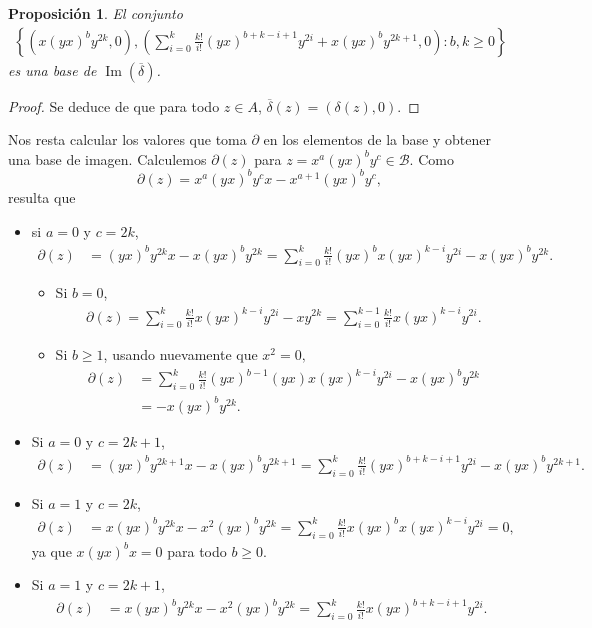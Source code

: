 \documentclass[a4paper,oneside,fleqn,11pt]{article}
\newtheorem{prop}{Proposición}
\numberwithin{prop}{subsection}
\DeclareMathOperator\Ima{Im}
\begin{document}
\begin{prop}
El conjunto
\begin{align*}
		\left\{ \left(x(yx)^by^{2k}, 0\right),
			\left(\sum_{i = 0}^k\frac{k!}{i!}(yx)^{b + k - i + 1}y^{2i} + x(yx)^by^{2k + 1},0\right) :b, k \geq 0 \right\}
\end{align*}
es una base de $\Ima(\overline{\delta})$.
\end{prop}
\begin{proof}
	Se deduce de que para todo $z \in A$, $\overline{\delta}(z) = (\delta(z), 0)$.
\end{proof}

Nos resta calcular los valores que toma $\partial$ en los elementos de la base y obtener una base de imagen.
Calculemos $\partial(z)$ para $z = x^a(yx)^by^c \in \mathcal{B}$. Como \[\partial(z) = x^a(yx)^by^cx - x^{a + 1}(yx)^by^c,\] resulta que
\begin{itemize}
\item si $a = 0$ y $c = 2k$,
	\begin{align*}
		\partial(z) &= (yx)^by^{2k}x - x(yx)^by^{2k} = \sum_{i = 0}^k\frac{k!}{i!}(yx)^bx(yx)^{k - i}y^{2i} - x(yx)^by^{2k}.
	\end{align*}
	\begin{itemize}
	\item Si $b = 0$,
		\begin{align*}
			\partial(z) = \sum_{i = 0}^k\frac{k!}{i!}x(yx)^{k - i}y^{2i} - xy^{2k} = \sum_{i = 0}^{k - 1}\frac{k!}{i!}x(yx)^{k - i}y^{2i}.
		\end{align*}
	\item Si $b \geq 1$, usando nuevamente que $x^2 = 0,$
		\begin{align*}
			\partial(z) &= \sum_{i = 0}^k\frac{k!}{i!}(yx)^{b-1}(yx)x(yx)^{k - i}y^{2i} - x(yx)^by^{2k} \\
			&=  -x(yx)^by^{2k}.
		\end{align*}
	\end{itemize}
\item Si $a = 0$ y $c = 2k + 1$,
	\begin{align*}
		\partial(z) &= (yx)^by^{2k + 1}x - x(yx)^by^{2k + 1}
			= \sum_{i = 0}^k\frac{k!}{i!}(yx)^{b + k - i + 1}y^{2i} - x(yx)^by^{2k + 1}.
	\end{align*}
\item Si $a = 1$ y  $c = 2k$,
	\begin{align*}
		\partial(z) &= x(yx)^by^{2k}x - x^2(yx)^by^{2k} 
			= \sum_{i = 0}^k\frac{k!}{i!}x(yx)^bx(yx)^{k - i}y^{2i} = 0,
	\end{align*}
ya que 	$x(yx)^bx = 0$ para todo $b \geq 0$.
\item Si $a = 1$ y  $c = 2k + 1$,
	\begin{align*}
		\partial(z) &= x(yx)^by^{2k}x - x^2(yx)^by^{2k} = \sum_{i = 0}^k\frac{k!}{i!}x(yx)^{b + k - i + 1}y^{2i}.
	\end{align*}
\end{itemize}
\end{document}

